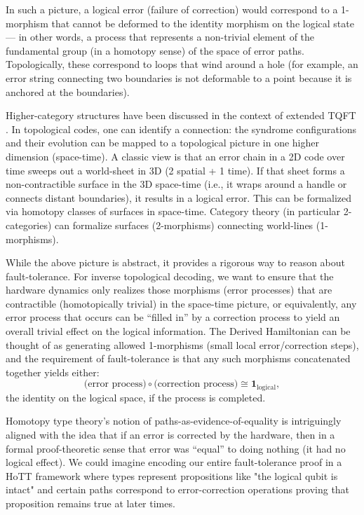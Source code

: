 \documentclass[11pt]{article}
\begin{document}
\begin{itemize}
        In such a picture, a logical error (failure of correction) would correspond to a 1-morphism that cannot be deformed to the identity morphism on the logical state --- in other words, a process that represents a non-trivial element of the fundamental group (in a homotopy sense) of the space of error paths. Topologically, these correspond to loops that wind around a hole (for example, an error string connecting two boundaries is not deformable to a point because it is anchored at the boundaries).
        
        Higher-category structures have been discussed in the context of extended TQFT \cite{Baez2011}. In topological codes, one can identify a connection: the syndrome configurations and their evolution can be mapped to a topological picture in one higher dimension (space-time). A classic view is that an error chain in a 2D code over time sweeps out a world-sheet in 3D (2 spatial + 1 time). If that sheet forms a non-contractible surface in the 3D space-time (i.e., it wraps around a handle or connects distant boundaries), it results in a logical error. This can be formalized via homotopy classes of surfaces in space-time. Category theory (in particular 2-categories) can formalize surfaces (2-morphisms) connecting world-lines (1-morphisms).
\end{itemize}

While the above picture is abstract, it provides a rigorous way to reason about fault-tolerance. For inverse topological decoding, we want to ensure that the hardware dynamics only realizes those morphisms (error processes) that are contractible (homotopically trivial) in the space-time picture, or equivalently, any error process that occurs can be ``filled in'' by a correction process to yield an overall trivial effect on the logical information. The Derived Hamiltonian can be thought of as generating allowed 1-morphisms (small local error/correction steps), and the requirement of fault-tolerance is that any such morphisms concatenated together yields either:
\[ \text{(error process)} \circ \text{(correction process)} \cong \mathbf{1}_{\text{logical}}, \] 
the identity on the logical space, if the process is completed. 

Homotopy type theory's notion of paths-as-evidence-of-equality is intriguingly aligned with the idea that if an error is corrected by the hardware, then in a formal proof-theoretic sense that error was ``equal'' to doing nothing (it had no logical effect). We could imagine encoding our entire fault-tolerance proof in a HoTT framework where types represent propositions like "the logical qubit is intact" and certain paths correspond to error-correction operations proving that proposition remains true at later times.
\end{document}
